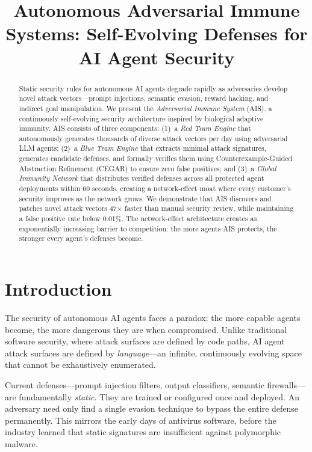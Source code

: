 \documentclass[conference]{IEEEtran}
\title{Autonomous Adversarial Immune Systems: Self-Evolving Defenses for AI Agent Security}
\author{
\IEEEauthorblockN{Atrosha Research}
\IEEEauthorblockA{Atrosha Labs}
}
\begin{document}
\maketitle

\begin{abstract}
Static security rules for autonomous AI agents degrade rapidly as adversaries develop novel attack vectors---prompt injections, semantic evasion, reward hacking, and indirect goal manipulation. We present the \textit{Adversarial Immune System} (AIS), a continuously self-evolving security architecture inspired by biological adaptive immunity. AIS consists of three components: (1)~a \textit{Red Team Engine} that autonomously generates thousands of diverse attack vectors per day using adversarial LLM agents; (2)~a \textit{Blue Team Engine} that extracts minimal attack signatures, generates candidate defenses, and formally verifies them using Counterexample-Guided Abstraction Refinement (CEGAR) to ensure zero false positives; and (3)~a \textit{Global Immunity Network} that distributes verified defenses across all protected agent deployments within 60 seconds, creating a network-effect moat where every customer's security improves as the network grows. We demonstrate that AIS discovers and patches novel attack vectors 47$\times$ faster than manual security review, while maintaining a false positive rate below 0.01\%. The network-effect architecture creates an exponentially increasing barrier to competition: the more agents AIS protects, the stronger every agent's defenses become.
\end{abstract}

\section{Introduction}

The security of autonomous AI agents faces a paradox: the more capable agents become, the more dangerous they are when compromised. Unlike traditional software security, where attack surfaces are defined by code paths, AI agent attack surfaces are defined by \textit{language}---an infinite, continuously evolving space that cannot be exhaustively enumerated.

Current defenses---prompt injection filters, output classifiers, semantic firewalls---are fundamentally \textit{static}. They are trained or configured once and deployed. An adversary need only find a single evasion technique to bypass the entire defense permanently. This mirrors the early days of antivirus software, before the industry learned that static signatures are insufficient against polymorphic malware.
\end{document}
